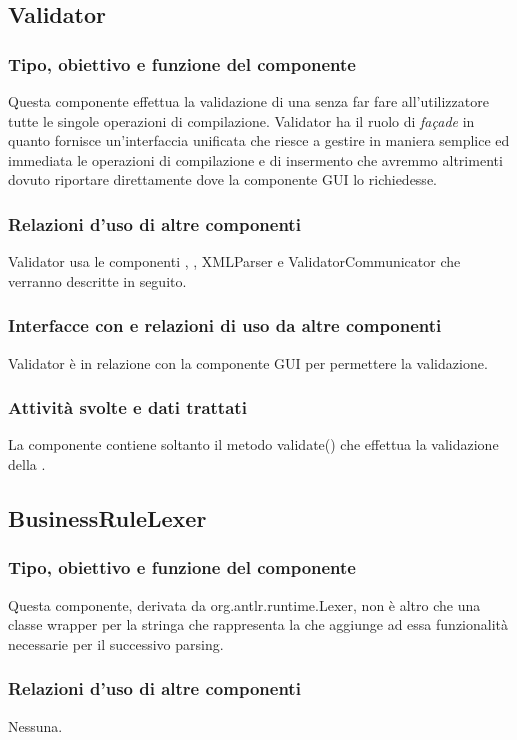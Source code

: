 \documentclass[11pt,titlepage,a4paper]{report}
\begin{document}
\subsection{Validator}%
\subsubsection{Tipo, obiettivo e funzione del componente}
Questa componente effettua la validazione di una \br senza far fare all'utilizzatore tutte le singole operazioni di compilazione.
Validator ha il ruolo di \textit{fa\c{c}ade} in quanto fornisce un'interfaccia unificata che riesce a gestire in maniera semplice ed immediata le operazioni di compilazione e di insermento che avremmo altrimenti dovuto riportare direttamente dove la componente GUI lo richiedesse.
\subsubsection{Relazioni d'uso di altre componenti}
Validator usa le componenti \brp, \brl, XMLParser e ValidatorCommunicator che verranno descritte in seguito.
\subsubsection{Interfacce con e relazioni di uso da altre componenti}
Validator \`e in relazione con la componente GUI per permettere la validazione.
\subsubsection{Attivit\`a svolte e dati trattati}
La componente contiene soltanto il metodo validate() che effettua la validazione della \br.

\subsection{BusinessRuleLexer}
\subsubsection{Tipo, obiettivo e funzione del componente}
Questa componente, derivata da org.antlr.runtime.Lexer, non \`e altro che una classe wrapper per la stringa che rappresenta la \br che aggiunge ad essa funzionalit\`a necessarie per il successivo parsing.
\subsubsection{Relazioni d'uso di altre componenti}
Nessuna.
\end{document}
